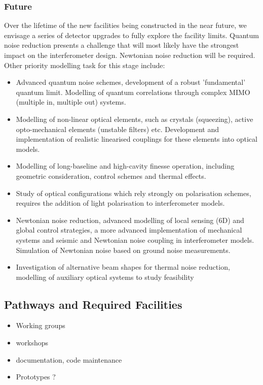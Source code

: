 \subsubsection{Future}
Over the lifetime of the new facilities being constructed in the
near future, we envisage a series of detector upgrades
to fully explore the facility limits.
Quantum noise reduction presents a challenge that
will most likely have the strongest impact on the interferometer
design. Newtonian noise reduction will be required.
Other priority modelling task for this stage include:

\begin{itemize}
\item Advanced quantum noise schemes, development of a 
  robust 'fundamental' quantum limit. Modelling of quantum
  correlations through complex MIMO (multiple in, multiple out)
  systems.
\item Modelling of non-linear optical elements, such as crystals
  (squeezing), active opto-mechanical elements (unstable filters)
  etc.  Development and implementation of realistic linearised
  couplings for these elements into optical models. 
\item Modelling of long-baseline and high-cavity finesse operation, 
including geometric consideration, control schemes and thermal
effects.
\item Study of optical configurations which rely strongly on polarisation 
schemes, requires the addition of light polarisation to interferometer models.
\item Newtonian noise reduction, advanced modelling of local sensing
  (6D) and global control strategies, a more advanced implementation 
of mechanical systems and seismic and Newtonian noise coupling in
interferometer models. Simulation of Newtonian noise based on ground 
noise measurements.
\item Investigation of alternative beam shapes for thermal noise
  reduction, modelling of auxiliary optical systems to study
  feasibility 
\end{itemize}


\subsection{Pathways and Required Facilities}
\begin{itemize}
\item Working groups
\item workshops
\item documentation, code maintenance 
\item Prototypes ?
\end{itemize}

